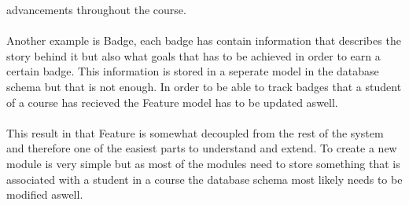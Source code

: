 advancements throughout the course.\\
\\
Another example is Badge, each badge has contain information that describes the
story behind it but also what goals that has to be achieved in order to earn a
certain badge. This information is stored in a seperate model in the database
schema but that is not enough. In order to be able to track badges that a student
of a course has recieved the Feature model has to be updated aswell.\\
\\
This result in that Feature is somewhat decoupled from the rest of the system and
therefore one of the easiest parts to understand and extend. To create a new module
is very simple but as most of the modules need to store something that is associated
with a student in a course the database schema most likely needs to be modified aswell.
